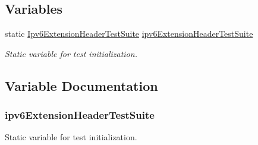 \subsection*{Variables}
\begin{DoxyCompactItemize}
\item 
static \hyperlink{classIpv6ExtensionHeaderTestSuite}{Ipv6\+Extension\+Header\+Test\+Suite} \hyperlink{ipv6-extension-header-test-suite_8cc_adc6164b8388736cdf0dad20e71739cbc}{ipv6\+Extension\+Header\+Test\+Suite}
\begin{DoxyCompactList}\small\item\em Static variable for test initialization. \end{DoxyCompactList}\end{DoxyCompactItemize}


\subsection{Variable Documentation}
\subsubsection[{\texorpdfstring{ipv6\+Extension\+Header\+Test\+Suite}{ipv6ExtensionHeaderTestSuite}}]{ ipv6\+Extension\+Header\+Test\+Suite\hspace{0.3cm}{\ttfamily [static]}}\hypertarget{ipv6-extension-header-test-suite_8cc_adc6164b8388736cdf0dad20e71739cbc}{}\label{ipv6-extension-header-test-suite_8cc_adc6164b8388736cdf0dad20e71739cbc}


Static variable for test initialization. 

